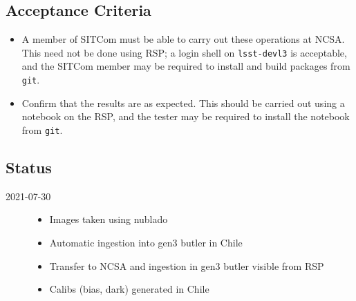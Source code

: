\subsection{Acceptance Criteria}
\begin{itemize}
\item A member of SITCom must be able to carry out these operations at NCSA.
  This need not be done using RSP; a login shell on \eg \texttt{lsst-devl3} is acceptable, and
  the SITCom member may be required to install and build packages from \texttt{git}.
\item Confirm that the results are as expected.  This should be carried out using a notebook on the RSP,
  and the tester may be required to install the notebook from \texttt{git}.
\end{itemize}

\subsection{Status}

\begin{description}
   \item[2021-07-30]
        \begin{itemize}
                \item Images taken using nublado
                \item Automatic ingestion into gen3 butler in Chile
                \item Transfer to NCSA and ingestion in gen3 butler visible from \gls{RSP}
                \item Calibs (bias, dark) generated in Chile
        \end{itemize}
   \end{description}

